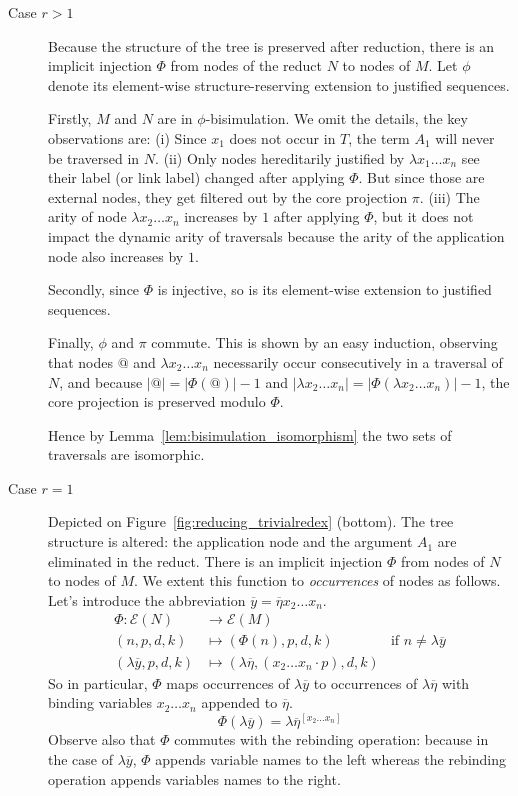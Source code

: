 \documentclass{elsarticle}
\theoremstyle{plain}
\theoremstyle{definition}
\def\coresymbol{\pi} %
\def\nameencoding{\mathcal{E}} %
\begin{document}
    \begin{description}
    \item[Case $r>1$] Because the structure of the tree is preserved after reduction, there is an implicit injection $\Phi$ from nodes of the reduct $N$ to nodes of $M$. Let $\phi$ denote its element-wise structure-reserving  extension to justified sequences.

    Firstly, $M$ and $N$ are in $\phi$-bisimulation. We omit the details, the key observations are:
    (i) Since $x_1$ does not occur in $T$, the term $A_1$ will never be traversed in $N$.
    (ii) Only nodes hereditarily justified by $\lambda x_1 \ldots x_n$ see their label (or link label) changed after applying $\Phi$. But since those are external nodes, they get filtered out by the core projection $\coresymbol$.
    (iii) The arity of node $\lambda x_2 \ldots x_n$ increases by $1$ after applying $\Phi$, but it does not impact the dynamic arity of traversals because the arity of the application node also increases by $1$.

    Secondly, since $\Phi$ is injective, so is its element-wise extension to justified sequences.

    Finally, $\phi$ and $\coresymbol$ commute. This is shown by an easy induction, observing that nodes $@$ and $\lambda x_2\ldots x_n$ necessarily occur consecutively in a traversal of $N$, and because $|@| = |\Phi(@)| -1$ and $|\lambda x_2\ldots x_n| = |\Phi(\lambda x_2\ldots x_n)| - 1$, the core projection is preserved modulo $\Phi$.

    Hence by Lemma~\ref{lem:bisimulation_isomorphism} the two sets of traversals are isomorphic.

    \item[Case $r=1$] Depicted on Figure~\ref{fig:reducing_trivialredex} (bottom). The tree structure is altered: the application node and the argument $A_1$ are eliminated in the reduct. There is an implicit injection $\Phi$ from nodes of $N$ to nodes of $M$. We extent this function to \emph{occurrences} of nodes as follows. Let's introduce the abbreviation $\overline{y} = \overline\eta x_2 \ldots x_n$.
    \begin{align*}
        \Phi\colon \nameencoding(N) &\rightarrow \nameencoding(M) \\
        (n,p,d,k) &\longmapsto (\Phi(n),p,d,k) & \mbox{if $n\neq\lambda\overline{y}$} \\
        (\lambda\overline{y},p,d,k) &\longmapsto (\lambda\overline\eta,(x_2 \ldots x_n \cdot p),d,k)
    \end{align*}
    So in particular, $\Phi$ maps occurrences of $\lambda\overline{y}$ to occurrences of $\lambda\overline\eta$ with binding variables $x_2 \ldots x_n$ appended to $\overline\eta$.
    \begin{equation}
        \Phi(\lambda\overline{y})
        =
        \lambda\overline\eta^{[x_2\ldots x_n]}
        \label{eqn:phi_maps_lambday_to_lambdaeta}
    \end{equation}
    Observe also that $\Phi$ commutes with the rebinding operation: because in the case of $\lambda\overline{y}$, $\Phi$ appends variable names to the left whereas the rebinding operation appends variables names to the right.


\end{description}
\end{document}
